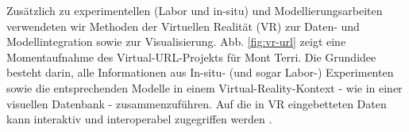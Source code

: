 
Zusätzlich zu experimentellen (Labor und in-situ) und Modellierungsarbeiten verwendeten wir Methoden der Virtuellen Realität (VR) zur Daten- und Modellintegration sowie zur Visualisierung. Abb. \ref{fig:vr-url} zeigt eine Momentaufnahme des Virtual-URL-Projekts für Mont Terri. Die Grundidee besteht darin, alle Informationen aus In-situ- (und sogar Labor-) Experimenten sowie die entsprechenden Modelle in einem Virtual-Reality-Kontext - wie in einer visuellen Datenbank - zusammenzuführen. Auf die in VR eingebetteten Daten kann interaktiv und interoperabel zugegriffen werden \cite{Rink2020}.
